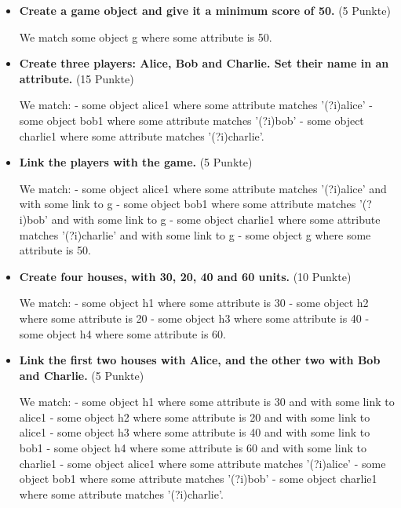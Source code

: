 \begin{itemize}
    \item \textbf{Create a game object and give it a minimum score of 50.} (5 Punkte)

    \begin{mdcodeblock}
        We match some object g where some attribute is 50.
    \end{mdcodeblock}

    \item \textbf{Create three players: Alice, Bob and Charlie.
    Set their name in an attribute.} (15 Punkte)

    \begin{mdcodeblock}
        We match:
        - some object alice1 where some attribute matches '(?i)alice'
        - some object bob1 where some attribute matches '(?i)bob'
        - some object charlie1 where some attribute matches '(?i)charlie'.
    \end{mdcodeblock}

    \item \textbf{Link the players with the game.} (5 Punkte)

    \begin{mdcodeblock}
        We match:
        - some object alice1 where some attribute matches '(?i)alice' and with some link to g
        - some object bob1 where some attribute matches '(?i)bob' and with some link to g
        - some object charlie1 where some attribute matches '(?i)charlie' and with some link to g
        - some object g where some attribute is 50.
    \end{mdcodeblock}

    \item \textbf{Create four houses, with 30, 20, 40 and 60 units.} (10 Punkte)

    \begin{mdcodeblock}
        We match:
        - some object h1 where some attribute is 30
        - some object h2 where some attribute is 20
        - some object h3 where some attribute is 40
        - some object h4 where some attribute is 60.
    \end{mdcodeblock}

    \item \textbf{Link the first two houses with Alice, and the other two with Bob and Charlie.} (5 Punkte)

    \begin{mdcodeblock}
        We match:
        - some object h1 where some attribute is 30 and with some link to alice1
        - some object h2 where some attribute is 20 and with some link to alice1
        - some object h3 where some attribute is 40 and with some link to bob1
        - some object h4 where some attribute is 60 and with some link to charlie1
        - some object alice1 where some attribute matches '(?i)alice'
        - some object bob1 where some attribute matches '(?i)bob'
        - some object charlie1 where some attribute matches '(?i)charlie'.
    \end{mdcodeblock}
\end{itemize}


